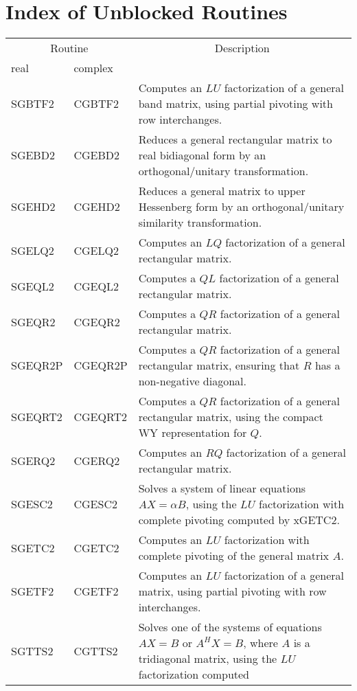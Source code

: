 \newpage

\section{Index of Unblocked Routines}\label{secindexauxilunblocked}

\begin{center}
\begin{tabular}{| l   l | p{4.5in}    |}
\hline \multicolumn{2}{|c|}{Routine}&\multicolumn{1}{c|}{Description} \\ 
\cline{1-2} real&complex&\\
\hline \hline
SGBTF2&CGBTF2&
Computes an $LU$ factorization of a general band matrix,
using partial pivoting with row interchanges.\\
SGEBD2&CGEBD2&
Reduces a general rectangular matrix to  real bidiagonal form 
by an orthogonal/unitary transformation.\\
SGEHD2&CGEHD2& 
Reduces a general matrix to upper Hessenberg form 
by an orthogonal/unitary similarity transformation.\\
SGELQ2&CGELQ2&
Computes an $LQ$ factorization of a general rectangular matrix.\\
SGEQL2&CGEQL2&
Computes a $QL$ factorization of a general rectangular matrix.\\
SGEQR2&CGEQR2&
Computes a $QR$ factorization of a general rectangular matrix.\\
SGEQR2P&CGEQR2P&
Computes a $QR$ factorization of a general rectangular matrix,
ensuring that $R$ has a non-negative diagonal.\\
SGEQRT2&CGEQRT2&
Computes a $QR$ factorization of a general rectangular matrix,
using the compact WY representation for $Q$.\\
SGERQ2&CGERQ2&
Computes an $RQ$ factorization of a general rectangular matrix.\\
SGESC2&CGESC2&
Solves a system of linear equations $A X = \alpha B$, using
the $LU$ factorization with complete pivoting computed by xGETC2.\\
SGETC2&CGETC2&
Computes an $LU$ factorization with complete pivoting of the
general matrix $A$.\\
SGETF2&CGETF2&
Computes an $LU$ factorization of a general matrix,
using partial pivoting with row interchanges.\\
SGTTS2&CGTTS2&
Solves one of the systems of equations $A X = B$ or  $A^H  X = B$,
where $A$ is a tridiagonal matrix, using the $LU$ factorization computed

\end{tabular}
\end{center}
